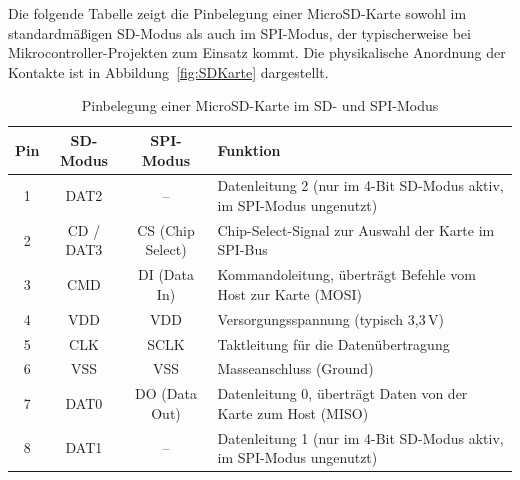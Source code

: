 Die folgende Tabelle zeigt die Pinbelegung einer MicroSD-Karte sowohl im standardmäßigen SD-Modus als auch im SPI-Modus, der typischerweise bei Mikrocontroller-Projekten zum Einsatz kommt. Die physikalische Anordnung der Kontakte ist in Abbildung~\ref{fig:SDKarte} dargestellt. \cite{KingstonTechnology.2022}

\begin{table}[H]
    \centering
    \begin{tabular}{|c|c|c|p{8cm}|}
        \hline
        \textbf{Pin} & \textbf{SD-Modus} & \textbf{SPI-Modus} & \textbf{Funktion} \\
        \hline
        1 & DAT2         & –                 & Datenleitung 2 (nur im 4-Bit SD-Modus aktiv, im SPI-Modus ungenutzt) \\
        2 & CD / DAT3    & CS (Chip Select)  & Chip-Select-Signal zur Auswahl der Karte im SPI-Bus \\
        3 & CMD          & DI (Data In)      & Kommandoleitung, überträgt Befehle vom Host zur Karte (MOSI) \\
        4 & VDD          & VDD               & Versorgungsspannung (typisch 3{,}3\,V) \\
        5 & CLK          & SCLK              & Taktleitung für die Datenübertragung \\
        6 & VSS          & VSS               & Masseanschluss (Ground) \\
        7 & DAT0         & DO (Data Out)     & Datenleitung 0, überträgt Daten von der Karte zum Host (MISO) \\
        8 & DAT1         & –                 & Datenleitung 1 (nur im 4-Bit SD-Modus aktiv, im SPI-Modus ungenutzt) \\
        \hline
    \end{tabular}
    \caption{Pinbelegung einer MicroSD-Karte im SD- und SPI-Modus}
    \label{tab:microSD_Pinbelegung}
\end{table}
\vspace{1ex}

